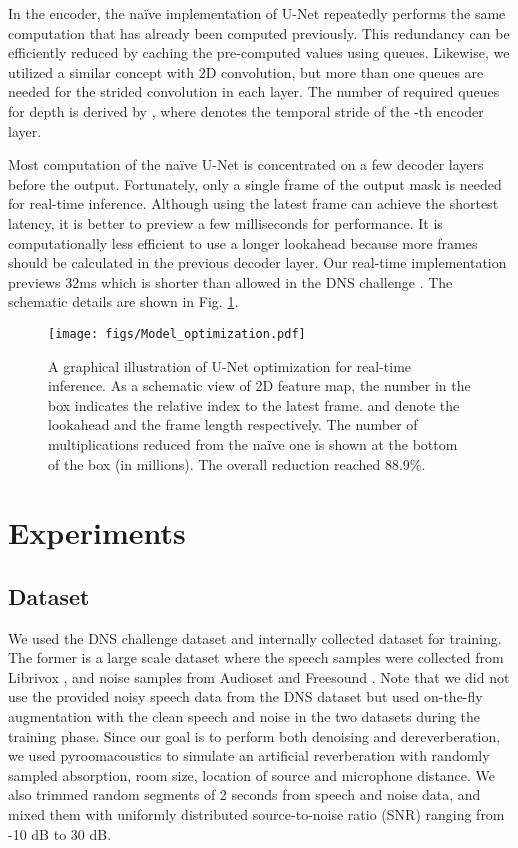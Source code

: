 \documentclass[a4paper]{article}
\begin{document}
In the encoder, the naïve implementation of U-Net repeatedly performs the same computation that has already been computed previously.
This redundancy can be efficiently reduced by caching the pre-computed values using queues.
Likewise, we utilized a similar concept with 2D convolution, but more than one queues are needed for the strided convolution in each layer.
The number of required queues for depth  is derived by , where  denotes the temporal stride of the -th encoder layer.

Most computation of the naïve U-Net is concentrated on a few decoder layers before the output. Fortunately, only a single frame of the output mask is needed for real-time inference. 
Although using the latest frame can achieve the shortest latency, it is better to preview a few milliseconds for performance.
It is computationally less efficient to use a longer lookahead because more frames should be calculated in the previous decoder layer. Our real-time implementation previews 32ms which is shorter than allowed in the DNS challenge \cite{reddy2020interspeech}. The schematic details are shown in Fig. \ref{fig:optimization}.

\begin{figure}[!t]
\centering
\texttt{[image: figs/Model\_optimization.pdf]}
\caption{A graphical illustration of U-Net optimization for real-time inference. As a schematic view of 2D feature map, the number in the box indicates the relative index to the latest frame.  and  denote the lookahead and the frame length respectively. The number of multiplications reduced from the naïve one is shown at the bottom of the box (in millions). The overall reduction reached 88.9\%.}
\label{fig:optimization}
\vspace*{-15pt}
\end{figure}

\section{Experiments}
\label{section:experiments}
\subsection{Dataset}
We used the DNS challenge dataset \cite{reddy2020interspeech} and internally collected dataset for training.
The former is a large scale dataset where the speech samples were collected from Librivox \cite{mcguirelibrivox}, and noise samples from Audioset \cite{gemmeke2017audio} and Freesound \cite{fonseca2017freesound}. Note that we did not use the provided noisy speech data from the DNS dataset but used on-the-fly augmentation with the clean speech and noise in the two datasets during the training phase. Since our goal is to perform both denoising and dereverberation, we used pyroomacoustics \cite{scheibler2018pyroomacoustics} to simulate an artificial reverberation with randomly sampled absorption, room size, location of source and microphone distance.
We also trimmed random segments of 2 seconds from speech and noise data, and mixed them with uniformly distributed source-to-noise ratio (SNR) ranging from -10 dB to 30 dB.
\end{document}
